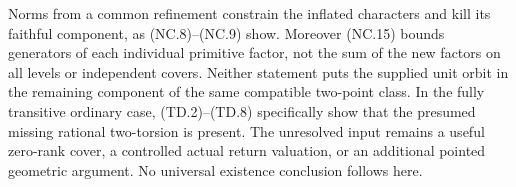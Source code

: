 Norms from a common refinement constrain the inflated
characters and kill its faithful component, as (NC.8)--(NC.9)
show. Moreover (NC.15) bounds generators of each individual
primitive factor, not the sum of the new factors on all
levels or independent covers. Neither statement puts the
supplied unit orbit in the remaining component of the same
compatible two-point class. In the fully transitive ordinary
case, (TD.2)--(TD.8) specifically show that the presumed
missing rational two-torsion is present. The unresolved
input remains a useful zero-rank cover, a controlled actual
return valuation, or an additional pointed geometric
argument. No universal existence conclusion follows here.

